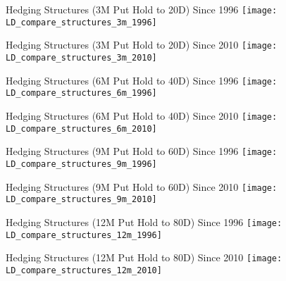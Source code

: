 \documentclass{beamer}
\begin{document}
\begin{frame}{Hedging Structures (3M Put Hold to 20D) Since 1996}
\texttt{[image: LD\_compare\_structures\_3m\_1996]}
\end{frame}
\begin{frame}{Hedging Structures (3M Put Hold to 20D) Since 2010}
\texttt{[image: LD\_compare\_structures\_3m\_2010]}
\end{frame}

\begin{frame}{Hedging Structures (6M Put Hold to 40D) Since 1996}
\texttt{[image: LD\_compare\_structures\_6m\_1996]}
\end{frame}
\begin{frame}{Hedging Structures (6M Put Hold to 40D) Since 2010}
\texttt{[image: LD\_compare\_structures\_6m\_2010]}
\end{frame}

\begin{frame}{Hedging Structures (9M Put Hold to 60D) Since 1996}
\texttt{[image: LD\_compare\_structures\_9m\_1996]}
\end{frame}
\begin{frame}{Hedging Structures (9M Put Hold to 60D) Since 2010}
\texttt{[image: LD\_compare\_structures\_9m\_2010]}
\end{frame}

\begin{frame}{Hedging Structures (12M Put Hold to 80D) Since 1996}
\texttt{[image: LD\_compare\_structures\_12m\_1996]}
\end{frame}
\begin{frame}{Hedging Structures (12M Put Hold to 80D) Since 2010}
\texttt{[image: LD\_compare\_structures\_12m\_2010]}
\end{frame}
\end{document}
